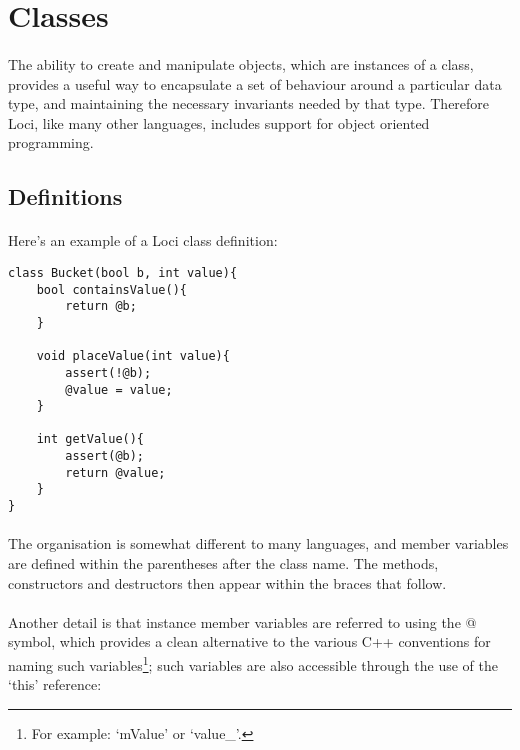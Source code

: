 \documentclass[12pt,twoside,notitlepage]{report}
\begin{document}
\section{Classes}

\paragraph{}
The ability to create and manipulate objects, which are instances of a class, provides a useful way to encapsulate a set of behaviour around a particular data type, and maintaining the necessary invariants needed by that type. Therefore Loci, like many other languages, includes support for object oriented programming.

\subsection{Definitions}

\paragraph{}
Here's an example of a Loci class definition:

\small{
\begin{verbatim}
class Bucket(bool b, int value){
    bool containsValue(){
        return @b;
    }
    
    void placeValue(int value){
        assert(!@b);
        @value = value;
    }
    
    int getValue(){
        assert(@b);
        return @value;
    }
}
\end{verbatim}
}

\paragraph{}
The organisation is somewhat different to many languages, and member variables are defined within the parentheses after the class name. The methods, constructors and destructors then appear within the braces that follow.

\paragraph{}
Another detail is that instance member variables are referred to using the @ symbol, which provides a clean alternative to the various C++ conventions for naming such variables\footnote{For example: `mValue' or `value\_'.}; such variables are also accessible through the use of the `this' reference:
\end{document}
